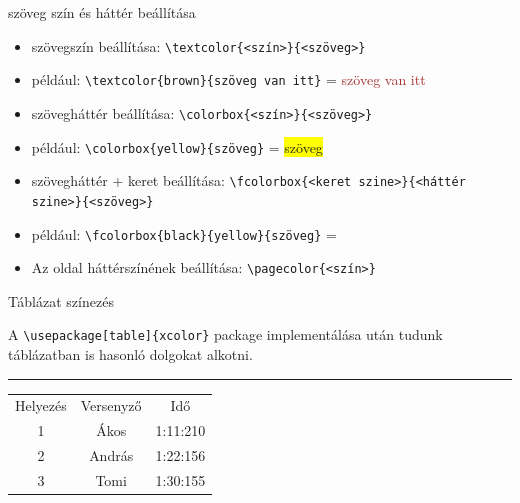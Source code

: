 \documentclass[aspectratio=1610, dvipsnames, xcolor=table]{beamer}
\begin{document}
    \begin{frame}[fragile]{szöveg szín és háttér beállítása}
        
        \begin{itemize}            
            \item {} szövegszín beállítása: \verb!\textcolor{<szín>}{<szöveg>}!
            \item {} például: \verb!\textcolor{brown}{szöveg van itt}! = \textcolor{brown}{szöveg van itt}
            \item {} szövegháttér beállítása: \verb!\colorbox{<szín>}{<szöveg>}!
            \item {} például: \verb!\colorbox{yellow}{szöveg}! = \colorbox{yellow}{szöveg}
            \item {} szövegháttér + keret beállítása: \verb!\fcolorbox{<keret szine>}{<háttér szine>}{<szöveg>}!
            \item {} például: \verb!\fcolorbox{black}{yellow}{szöveg}! = 
            \item {} Az oldal háttérszínének beállítása: \verb!\pagecolor{<szín>}!
        \end{itemize}
    \end{frame}
    
    \begin{frame}[fragile]{Táblázat színezés}
        \begin{center}
            A \verb!\usepackage[table]{xcolor}! package implementálása után tudunk táblázatban is hasonló dolgokat alkotni.
            \noindent
            {\color{Dandelion} \rule{\linewidth}{1mm}}
        \end{center}
        \vfill
        \begin{center}
            \begin{tabular}{|c|c|c|}
                \hline
                \rowcolor{Apricot}Helyezés & Versenyző & Idő \\
                \cellcolor{ForestGreen}1 & \cellcolor{Orchid}Ákos & \cellcolor{Aquamarine}1:11:210 \\
                \cellcolor{Yellow}2  & \cellcolor{Mulberry}András & \cellcolor{Emerald}1:22:156  \\
                \cellcolor{BurntOrange}3 & \cellcolor{Plum}Tomi  &  \cellcolor{PineGreen}1:30:155 \\
                \hline
            \end{tabular}
        \end{center}
    \end{frame}
\end{document}
